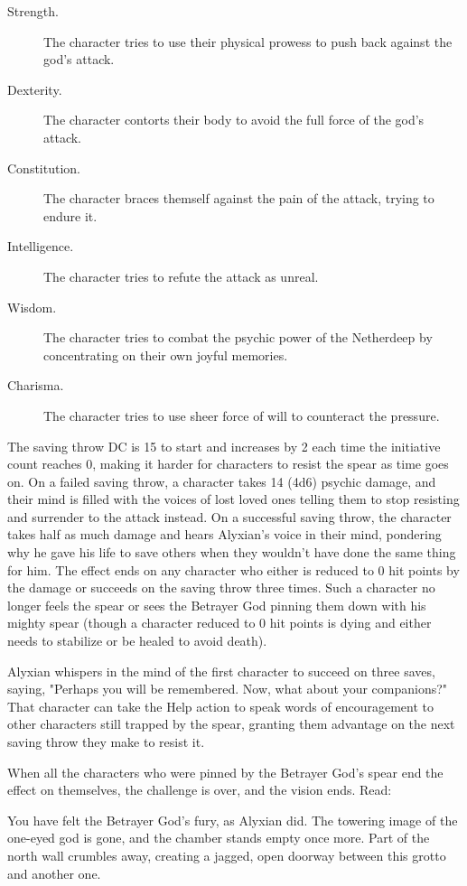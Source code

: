 \documentclass[10pt,a4paper,twoside,fancy,bg=print,twocolumn,openany,nodeprecatedcode]{dndbook}
\begin{document}
\begin{description}
\item[Strength.]
The character tries to use their physical prowess to push back against the god's attack.
\item[Dexterity.]
The character contorts their body to avoid the full force of the god's attack.
\item[Constitution.]
The character braces themself against the pain of the attack, trying to endure it.
\item[Intelligence.]
The character tries to refute the attack as unreal.
\item[Wisdom.]
The character tries to combat the psychic power of the Netherdeep by concentrating on their own joyful memories.
\item[Charisma.]
The character tries to use sheer force of will to counteract the pressure.
\end{description}

The saving throw DC is 15 to start and increases by 2 each time the initiative count reaches 0, making it harder for characters to resist the spear as time goes on. On a failed saving throw, a character takes 14 (4d6) psychic damage, and their mind is filled with the voices of lost loved ones telling them to stop resisting and surrender to the attack instead. On a successful saving throw, the character takes half as much damage and hears Alyxian's voice in their mind, pondering why he gave his life to save others when they wouldn't have done the same thing for him. The effect ends on any character who either is reduced to 0 hit points by the damage or succeeds on the saving throw three times. Such a character no longer feels the spear or sees the Betrayer God pinning them down with his mighty spear (though a character reduced to 0 hit points is dying and either needs to stabilize or be healed to avoid death).

Alyxian whispers in the mind of the first character to succeed on three saves, saying, "Perhaps you will be remembered. Now, what about your companions?" That character can take the Help action to speak words of encouragement to other characters still trapped by the spear, granting them advantage on the next saving throw they make to resist it.

When all the characters who were pinned by the Betrayer God's spear end the effect on themselves, the challenge is over, and the vision ends. Read:

\begin{DndReadAloud}{}
You have felt the Betrayer God's fury, as Alyxian did. The towering image of the one-eyed god is gone, and the chamber stands empty once more. Part of the north wall crumbles away, creating a jagged, open doorway between this grotto and another one.

\end{DndReadAloud}
\end{document}
